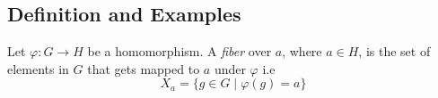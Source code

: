 \subsection{Definition and Examples}

\begin{definition}
    Let $\varphi : G \to H$ be a homomorphism. A \textit{fiber} over $a$, where $a \in H$, is the set of elements in $G$ that gets 
    mapped to $a$ under $\varphi$ i.e 
    \[ X_a = \{ g \in G \mid \varphi(g)=a \} \]
\end{definition}
